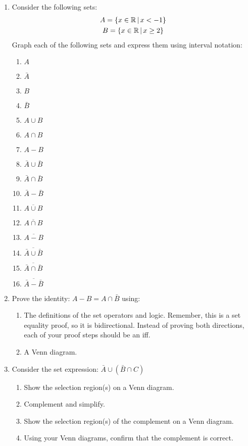 \documentclass[letterpaper,12pt,fleqn]{article}
\begin{document}
\begin{enumerate}[left=0in,itemsep=0.5in]
\item Consider the following sets:
  \begin{gather*}
    A=\left\{{x\in\mathbb{R}}\,\middle|\,{x<-1}\right\} \\
    B=\left\{{x\in\mathbb{R}}\,\middle|\,{x\ge2}\right\} \\
  \end{gather*}
  Graph each of the following sets and express them using interval notation:
  \begin{enumerate}
  \item \(A\)
  \item \(\bar{A}\)
  \item \(B\)
  \item \(\bar{B}\)
  \item \(A\cup B\)
  \item \(A\cap B\)
  \item \(A-B\)
  \item \(\bar{A}\cup\bar{B}\)
  \item \(\bar{A}\cap\bar{B}\)
  \item \(\bar{A}-\bar{B}\)
  \item \(\overline{A\cup B}\)
  \item \(\overline{A\cap B}\)
  \item \(\overline{A-B}\)
  \item \(\overline{\bar{A}\cup\bar{B}}\)
  \item \(\overline{\bar{A}\cap\bar{B}}\)
  \item \(\overline{\bar{A}-\bar{B}}\)
  \end{enumerate}

\item Prove the identity: \(A-B=A\cap\bar{B}\) using:
  \begin{enumerate}
  \item The definitions of the set operators and logic.  Remember, this is a set equality proof, so it is
    bidirectional.  Instead of proving both directions, each of your proof steps should be an iff.
  \item A Venn diagram.
  \end{enumerate}

\item Consider the set expression: \(\bar{A}\cup(\bar{B}\cap{C})\)
  \begin{enumerate}
  \item Show the selection region(s) on a Venn diagram.
  \item Complement and simplify.
  \item Show the selection region(s) of the complement on a Venn diagram.
  \item Using your Venn diagrams, confirm that the complement is correct.
  \end{enumerate}


\end{enumerate}
\end{document}
